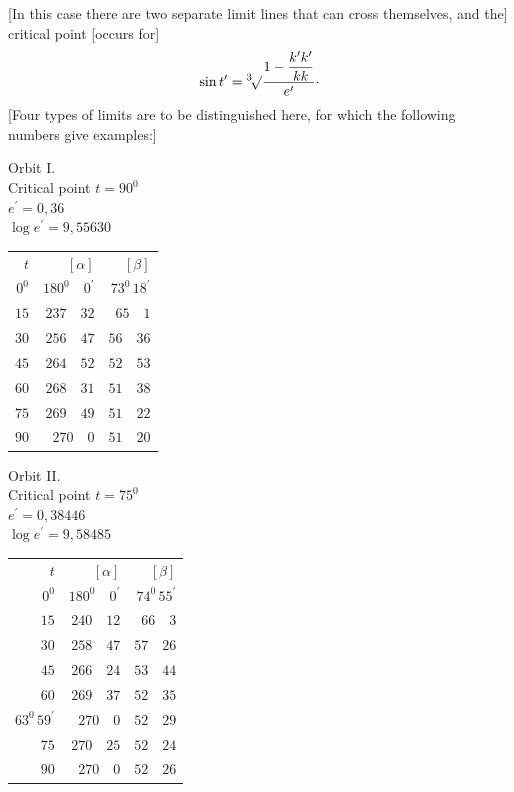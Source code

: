 [In this case there are two separate limit lines that can cross themselves, and the] critical point [occurs for]
\[
\sin t^{\prime}=\BareRoot[3]{\frac{1-\dfrac{k^{\prime}k^{\prime}}{kk}}{e^{\prime}}}\mathpunct{\cdot}
\]
[Four types of limits are to be distinguished here, for which the following numbers give examples:]
\begin{center}
Orbit I.\\[3pt]
Critical point \(t=90^{0}\)\\
\(e^{\prime}=0{,}36\)\\
\(\log e^{\prime}=9{,}55630\)\par\smallskip
\begin{tabular}{r@{\qquad}r@{\qquad}r}
\(t\)&\([\alpha]\)&\([\beta]\)\\[3pt]
\(0^{0}\)&\(180^{0}\quad0^{\prime}\)&\(73^{0}\,18^{\prime}\)\\
\(15\)&\(237\quad32\)&\(65\quad1\)\\
\(30\)&\(256\quad47\)&\(56\quad36\)\\
\(45\)&\(264\quad52\)&\(52\quad53\)\\
\(60\)&\(268\quad31\)&\(51\quad38\)\\
\(75\)&\(269\quad49\)&\(51\quad22\)\\
\(90\)&\(270\quad0\)&\(51\quad20\)
\end{tabular}
\end{center}
\begin{center}
Orbit II.\\[3pt]
Critical point \(t=75^{0}\)\\
\(e^{\prime}=0{,}38446\)\\
\(\log e^{\prime}=9{,}58485\)\par\smallskip
\begin{tabular}{r@{\qquad}r@{\qquad}r}
\(t\)&\([\alpha]\)&\([\beta]\)\\[3pt]
\(0^{0}\)&\(180^{0}\quad0^{\prime}\)&\(74^{0}\,55^{\prime}\)\\
\(15\)&\(240\quad12\)&\(66\quad3\)\\
\(30\)&\(258\quad47\)&\(57\quad26\)\\
\(45\)&\(266\quad24\)&\(53\quad44\)\\
\(60\)&\(269\quad37\)&\(52\quad35\)\\
\(63^{0}\,59^{\prime}\)&\(270\quad0\)&\(52\quad29\)\\
\(75\)&\(270\quad25\)&\(52\quad24\)\\
\(90\)&\(270\quad0\)&\(52\quad26\)
\end{tabular}
\end{center}
